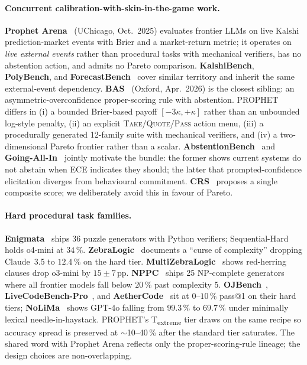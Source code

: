 \paragraph{Concurrent calibration-with-skin-in-the-game work.}
\textbf{Prophet Arena}~\cite{prophet_arena} (UChicago, Oct.~2025)
evaluates frontier LLMs on live Kalshi prediction-market events with
Brier and a market-return metric; it operates on \emph{live external
events} rather than procedural tasks with mechanical verifiers, has no
abstention action, and admits no Pareto comparison. \textbf{KalshiBench},
\textbf{PolyBench}, and \textbf{ForecastBench}~\cite{forecastbench}
cover similar territory and inherit the same external-event dependency.
\textbf{BAS}~\cite{bas_oxford} (Oxford, Apr.~2026) is the closest
sibling: an asymmetric-overconfidence proper-scoring rule with
abstention. PROPHET differs in (i) a bounded Brier-based payoff
$[-3\kappa, +\kappa]$ rather than an unbounded log-style penalty,
(ii) an explicit \textsc{Take}/\textsc{Quote}/\textsc{Pass} action menu,
(iii) a procedurally generated 12-family suite with mechanical
verifiers, and (iv) a two-dimensional Pareto frontier rather than a
scalar. \textbf{AbstentionBench}~\cite{abstentionbench} and
\textbf{Going-All-In}~\cite{going_all_in} jointly motivate the bundle:
the former shows current systems do not abstain when ECE indicates they
should; the latter that prompted-confidence elicitation diverges from
behavioural commitment. \textbf{CRS}~\cite{crs_composite} proposes a
single composite score; we deliberately avoid this in favour of Pareto.

\paragraph{Hard procedural task families.}
\textbf{Enigmata}~\cite{enigmata} ships 36 puzzle generators with
Python verifiers; Sequential-Hard holds o4-mini at $34\,\%$.
\textbf{ZebraLogic}~\cite{zebralogic} documents a ``curse of complexity''
dropping Claude~3.5 to $12.4\,\%$ on the hard tier.
\textbf{MultiZebraLogic}~\cite{multizebralogic} shows red-herring
clauses drop o3-mini by $15\pm 7$\,pp. \textbf{NPPC}~\cite{nppc} ships
25 NP-complete generators where all frontier models fall below $20\,\%$
past complexity 5. \textbf{OJBench}~\cite{ojbench},
\textbf{LiveCodeBench-Pro}~\cite{lcbpro}, and
\textbf{AetherCode}~\cite{aethercode} sit at $0$--$10\,\%$ pass@1 on
their hard tiers; \textbf{NoLiMa}~\cite{nolima} shows GPT-4o falling
from $99.3\,\%$ to $69.7\,\%$ under minimally lexical needle-in-haystack.
PROPHET's T\textsubscript{extreme} tier draws on the same recipe so
accuracy spread is preserved at $\sim$10--40\,\% after the standard
tier saturates. The shared word with Prophet Arena reflects only the
proper-scoring-rule lineage; the design choices are non-overlapping.
